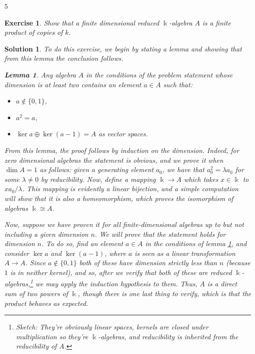 \documentclass{article}
\newtheorem{lemma}{Lemma}
\newtheorem{ex}{Exercise}
\theoremstyle{nonumberplain}
\newtheorem{sol}{Solution}
\newcommand{\kk}{\Bbbk}
\begin{document}
\setcounter{ex}5

\begin{ex}
Show that a finite dimensional reduced $\kk$-algebra $A$ is a finite product of copies of $k$.
\end{ex}

\begin{sol}
To do this exercise, we begin by stating a lemma and showing that from this lemma the conclusion follows.

\begin{lemma}\label{lemma:alg}
Any algebra $A$ in the conditions of the problem statement whose dimension is at least two contains an element $a \in A$ such that:
\begin{itemize}
\item $a \not \in \{0,1\}$,
\item $a^2 = a$,
\item $\ker a \oplus \ker(a-1) = A$ as vector spaces.
\end{itemize}
\end{lemma}

From this lemma, the proof follows by induction on the dimension. Indeed, for zero dimensional algebras the statement is obvious, and we prove it when $\dim A = 1$ as follows: given a generating element $a_0$, we have that $a_0^2 = \lambda a_0$ for some $\lambda \neq 0$ by reducibility. Now, define a mapping $\kk \to A$ which takes $x \in \kk$ to $x a_0 / \lambda$. This mapping is evidently a linear bijection, and a simple computation will show that it is also a homeomorphism, which proves the isomorphism of algebras $\kk \cong A$.

Now, suppose we have proven it for all finite-dimensional algebras up to but not including a given dimension $n$. We will prove that the statement holds for dimension $n$. To do so, find an element $a \in A$ in the conditions of lemma \ref{lemma:alg}, and consider $\ker a$ and $\ker(a-1)$, where $a$ is seen as a linear transformation $A \to A$. Since $a \not \in \{0,1\}$ both of these have dimension strictly less than $n$ (because $1$ is in neither kernel), and so, after we verify that both of these are reduced $\kk$-algebras,\footnote{Sketch: They're obviously linear spaces, kernels are closed under multiplication so they're $\kk$-algebras, and reducibility is inherited from the reducibility of $A$.} we may apply the induction hypothesis to them. Thus, $A$ is a direct sum of two powers of $\kk$, though there is one last thing to verify, which is that the product behaves as expected.


\end{sol}
\end{document}
